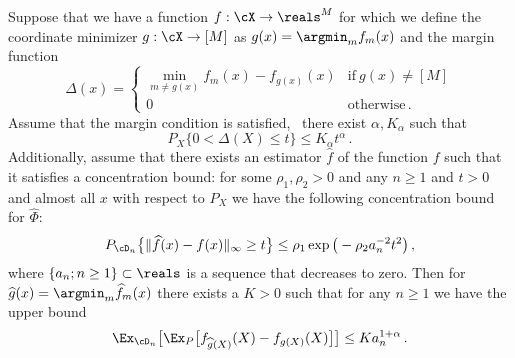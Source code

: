 \begin{lemma} \label{lemma:excess-risk-bound-generalization}
    Suppose that we have a function $f:\cX \to \reals ^M $ for which we define the coordinate minimizer $g:\cX \to [M]$ as $g(x) = \argmin_m f_m(x) $ and the margin function 
    \[
   \Delta(x) =  \begin{cases}
       \min_{m \neq g(x)} f_m(x) - f_{g(x)}(x) & \text{if} ~ g(x) \neq [M]\\
       0 & \text{otherwise}\,.
    \end{cases}
    \]
    Assume that the margin condition is satisfied, \ie\ there exist $\alpha, K_\alpha$ such that 
\begin{equation}
     P_X \big\{0 < \Delta (X) \le t\big \}  \le K_\alpha t^{\alpha}\,.
\end{equation} Additionally, assume that there exists an estimator $\widehat f$ of the function $f$ such that it satisfies a concentration bound: 
for some $\rho_1, \rho_2 > 0$ and any $n \ge 1$ and $t > 0$ and almost all $x$ with respect to $P_X$ we have the following concentration bound for $\widehat \Phi$:
    \begin{equation}\label{eq:concentration-f}
         P_{\cD_n} \big \{ \|\widehat f(x) - f (x)\|_\infty  \ge t\big \} \le  \rho_1 \exp\big (- \rho_2 a_n^{-2} t^2 \big )\,, 
    \end{equation}
    where $\{a_n; n \ge 1\}\subset \reals$ is a sequence that decreases to zero. Then for $\widehat g(x) = \argmin_m \widehat f_m(x)$ there exists a $K> 0$ such that for any $n \ge 1$  we have the upper bound
    \begin{equation}
         \Ex_{\cD_n}\big [ \Ex_P\big [ f_{\widehat g(X)}(X) - f_{g(X)}(X)  \big]\big ] \le K a_n^{{1+ \alpha}}\,. 
    \end{equation}
\end{lemma}



